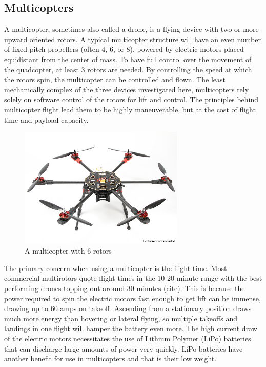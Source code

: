 \subsection{Multicopters}
A multicopter, sometimes also called a drone, is a flying device with two or more upward oriented rotors. A typical multicopter structure will have an even number of fixed-pitch propellers (often 4, 6, or 8), powered by electric motors placed equidistant from the center of mass. To have full control over the movement of the quadcopter, at least 3 rotors are needed. By controlling the speed at which the rotors spin, the multicopter can be controlled and flown. The least mechanically complex of the three devices investigated here, multicopters rely solely on software control of the rotors for lift and control. The principles behind multicopter flight lead them to be highly maneuverable, but at the cost of flight time and payload capacity.
\begin{figure}[ht]
\centering
\includegraphics[width=0.70\textwidth]{img/hexacopter.jpg}
\caption{A multicopter with 6 rotors}
\label{fig:multicopter_hex}
\end{figure}\par
The primary concern when using a multicopter is the flight time. Most commercial multirotors quote flight times in the 10-20 minute range with the best performing drones topping out around 30 minutes (cite). This is because the power required to spin the electric motors fast enough to get lift can be immense, drawing up to 60 amps on takeoff. Ascending from a stationary position draws much more energy than hovering or lateral flying, so multiple takeoffs and landings in one flight will hamper the battery even more. The high current draw of the electric motors necessitates the use of Lithium Polymer (LiPo) batteries that can discharge large amounts of power very quickly. LiPo batteries have another benefit for use in multicopters and that is their low weight.\par
